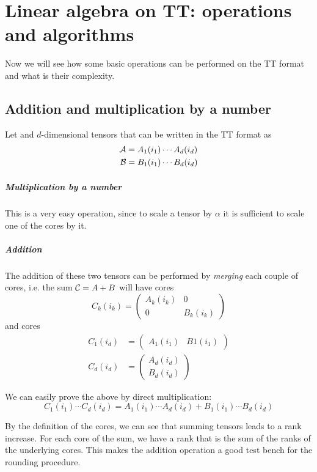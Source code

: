 \chapter{Linear algebra on TT: operations and algorithms}
Now we will see how some basic operations can be performed on the TT format and what is their complexity.

\section{Addition and multiplication by a number}
Let \A and \B $d$-dimensional tensors that can be written in the TT format as
\begin{equation*}
  \begin{split}
    \mathcal{A} &= A_1(i_1) \cdots A_d(i_d)\\
    \mathcal{B} &= B_1(i_1) \cdots B_d(i_d)
  \end{split}
\end{equation*}

\paragraph{Multiplication by a number}
This is a very easy operation, since to scale a tensor by $\alpha$ it is sufficient to scale one of the cores by it.

\paragraph{Addition}
The addition of these two tensors can be performed by \emph{merging} each couple of cores, i.e. the sum $\mathcal{C} = A + B$ will have  cores
\begin{equation*}
  C_k(i_k) = 
  \begin{pmatrix}
    A_k(i_k) & 0\\
    0 & B_k(i_k)
  \end{pmatrix}
\end{equation*}
and  cores
\begin{equation*}
  \begin{split}
    C_1(i_d) &= 
  \begin{pmatrix}
    A_1(i_1) & B1(i_1)
  \end{pmatrix}\\
  C_d(i_d) &= 
  \begin{pmatrix}
    A_d(i_d)\\
    B_d(i_d)
  \end{pmatrix}
  \end{split}
\end{equation*}

We can easily prove the above by direct multiplication:
\begin{equation*}
  C_1(i_1) \cdots C_d(i_d) = A_1(i_1) \cdots A_d(i_d) + B_1(i_1) \cdots B_d(i_d)
\end{equation*}

By the definition of the cores, we can see that summing tensors leads to a rank increase. For each core of the sum, we have a rank that is the sum of the ranks of the underlying cores. This makes the addition operation a good test bench for the rounding procedure.
